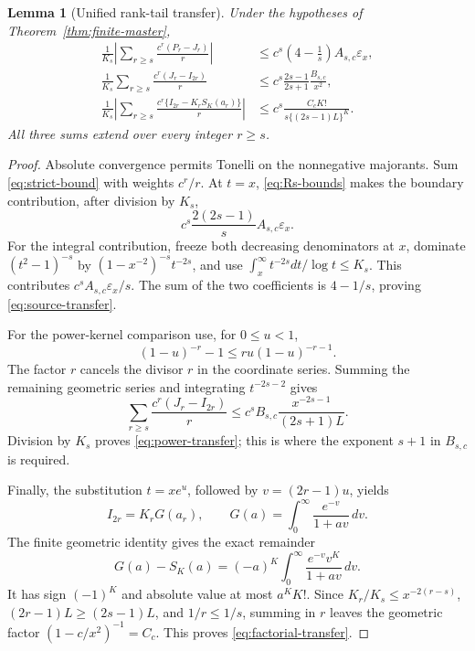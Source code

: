 \documentclass[11pt]{article}
\newtheorem{lemma}[theorem]{Lemma}
\theoremstyle{definition}
\theoremstyle{remark}
\newcommand{\eps}{\varepsilon}
\begin{document}
\begin{lemma}[Unified rank-tail transfer]
\label{lem:unified-transfer}
Under the hypotheses of Theorem~\ref{thm:finite-master},
\begin{align}
 \frac1{K_s}\left|\sum_{r\ge s}\frac{c^r(P_r-J_r)}r\right|
 &\le c^s\left(4-\frac1s\right)A_{s,c}\eps_x,
 \label{eq:source-transfer}\\
 \frac1{K_s}\sum_{r\ge s}\frac{c^r(J_r-I_{2r})}r
 &\le c^s\frac{2s-1}{2s+1}\frac{B_{s,c}}{x^2},
 \label{eq:power-transfer}\\
 \frac1{K_s}\left|\sum_{r\ge s}
 \frac{c^r\{I_{2r}-K_rS_K(a_r)\}}r\right|
 &\le c^s\frac{C_cK!}{s\{(2s-1)L\}^K}.
 \label{eq:factorial-transfer}
\end{align}
All three sums extend over every integer $r\ge s$.
\end{lemma}

\begin{proof}
Absolute convergence permits Tonelli on the nonnegative majorants.
Sum \eqref{eq:strict-bound} with weights $c^r/r$.  At $t=x$,
\eqref{eq:Rs-bounds} makes the boundary contribution, after division by
$K_s$,
\[
 c^s\frac{2(2s-1)}sA_{s,c}\eps_x.
\]
For the integral contribution, freeze both decreasing denominators at
$x$, dominate $(t^2-1)^{-s}$ by
$(1-x^{-2})^{-s}t^{-2s}$, and use
$\int_x^\infty t^{-2s}dt/\log t\le K_s$.  This contributes
$c^sA_{s,c}\eps_x/s$.  The sum of the two coefficients is
$4-1/s$, proving \eqref{eq:source-transfer}.

For the power-kernel comparison use, for $0\le u<1$,
\begin{equation}
 (1-u)^{-r}-1\le ru(1-u)^{-r-1}.
 \label{eq:power-mean}
\end{equation}
The factor $r$ cancels the divisor $r$ in the coordinate series.
Summing the remaining geometric series and integrating
$t^{-2s-2}$ gives
\[
 \sum_{r\ge s}\frac{c^r(J_r-I_{2r})}r
 \le c^sB_{s,c}\frac{x^{-2s-1}}{(2s+1)L}.
\]
Division by $K_s$ proves \eqref{eq:power-transfer}; this is where the
exponent $s+1$ in $B_{s,c}$ is required.

Finally, the substitution $t=xe^u$, followed by
$v=(2r-1)u$, yields
\begin{equation}
 I_{2r}=K_rG(a_r),\qquad
 G(a)=\int_0^\infty\frac{e^{-v}}{1+av}\,dv.
 \label{eq:Laplace}
\end{equation}
The finite geometric identity gives the exact remainder
\begin{equation}
 G(a)-S_K(a)=(-a)^K\int_0^\infty
 \frac{e^{-v}v^K}{1+av}\,dv.
 \label{eq:factorial-remainder}
\end{equation}
It has sign $(-1)^K$ and absolute value at most $a^KK!$.  Since
$K_r/K_s\le x^{-2(r-s)}$, $(2r-1)L\ge(2s-1)L$, and $1/r\le1/s$,
summing in $r$ leaves the geometric factor
$(1-c/x^2)^{-1}=C_c$.  This proves
\eqref{eq:factorial-transfer}.
\end{proof}
\end{document}
